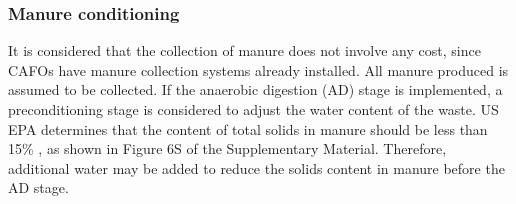 \documentclass[authoryear]{elsarticle}
\begin{document}
\subsubsection{Manure conditioning}
It is considered that the collection of manure does not involve any cost, since CAFOs have manure collection systems already installed. All manure produced is assumed to be collected. If the anaerobic digestion (AD) stage is implemented, a preconditioning stage is considered to adjust the water content of the waste. US EPA determines that the content of total solids in manure should be less than 15\% \citep{AgSTARHandbook}, as shown in Figure 6S of the Supplementary Material. Therefore, additional water may be added to reduce the solids content in manure before the AD stage.
%
\end{document}
